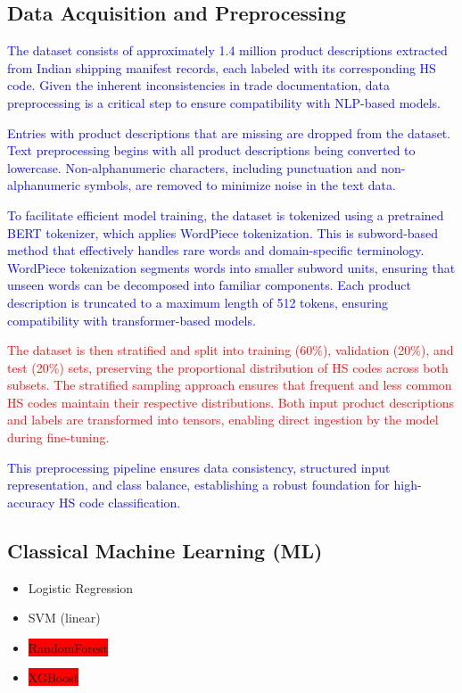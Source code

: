 \documentclass[mnsc,nonblindrev]{informs3} %
\begin{document}
\subsection{Data Acquisition and Preprocessing}
\textcolor{blue}{The dataset consists of approximately 1.4 million product descriptions extracted from Indian shipping manifest records, each labeled with its corresponding HS code. Given the inherent inconsistencies in trade documentation, data preprocessing is a critical step to ensure compatibility with NLP-based models.}

\textcolor{blue}{Entries with product descriptions that are missing are dropped from the dataset. Text preprocessing begins with all product descriptions being converted to lowercase. Non-alphanumeric characters, including punctuation and non-alphanumeric symbols, are removed to minimize noise in the text data.}

\textcolor{blue}{To facilitate efficient model training, the dataset is tokenized using a pretrained BERT tokenizer, which applies WordPiece tokenization. This is subword-based method that effectively handles rare words and domain-specific terminology. WordPiece tokenization segments words into smaller subword units, ensuring that unseen words can be decomposed into familiar components. Each product description is truncated to a maximum length of 512 tokens, ensuring compatibility with transformer-based models.}

\textcolor{red}{The dataset is then stratified and split into training (60\%), validation (20\%), and test (20\%) sets, preserving the proportional distribution of HS codes across both subsets. The stratified sampling approach ensures that frequent and less common HS codes maintain their respective distributions. Both input product descriptions and labels are transformed into tensors, enabling direct ingestion by the model during fine-tuning.}

\textcolor{blue}{This preprocessing pipeline ensures data consistency, structured input representation, and class balance, establishing a robust foundation for high-accuracy HS code classification.}


\subsection{Classical Machine Learning (ML)}
\begin{itemize}
    \item Logistic Regression
    \item SVM (linear)
    \item \colorbox{red}{RandomForest}
    \item \colorbox{red}{XGBoost}
\end{itemize}
\end{document}
